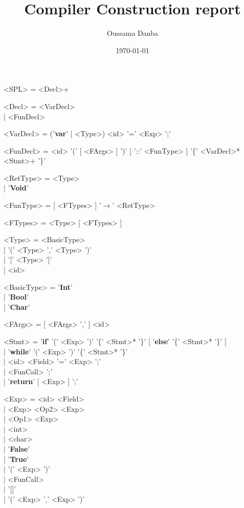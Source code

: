 \documentclass{article}
\title{Compiler Construction report}
\author{Oussama Danba}
\date{\today}
\begin{document}
\maketitle

\renewcommand{\syntleft}{$\langle$\normalfont\ttfamily}
\setlength{\grammarindent}{2cm}
\setlength{\grammarparsep}{0cm}
\begin{grammar}
<SPL> = <Decl>+

<Decl> = <VarDecl> \\| <FunDecl>

<VarDecl> = ('\textbf{var}' | <Type>) <id> '=' <Exp> ';'

<FunDecl> = <id> '(' [ <FArgs> ] ')' [ '::' <FunType> ] '\{' <VarDecl>* <Stmt>+ '\}'

<RetType> = <Type> \\| '\textbf{Void}'

<FunType> = [ <FTypes> ] '$\rightarrow$' <RetType>

<FTypes> = <Type> [ <FTypes> ]

<Type> = <BasicType> \\| '(' <Type> ',' <Type> ')' \\| '[' <Type> ']' \\| <id>

<BasicType> = '\textbf{Int}' \\| '\textbf{Bool}' \\| '\textbf{Char}'

<FArgs> = [ <FArgs> ',' ] <id>

<Stmt> = '\textbf{if}' '(' <Exp> ')' '\{' <Stmt>* '\}' [ '\textbf{else}' '\{' <Stmt>* '\}' ] \\| '\textbf{while}' '(' <Exp> ')' '\{' <Stmt>* '\}' \\| <id> <Field> '=' <Exp> ';' \\| <FunCall> ';' \\| '\textbf{return}' [ <Exp> ] ';'

<Exp> = <id> <Field> \\| <Exp> <Op2> <Exp> \\| <Op1> <Exp> \\| <int> \\| <char> \\| '\textbf{False}' \\| '\textbf{True}' \\| '(' <Exp> ')' \\| <FunCall> \\| '[]' \\| '(' <Exp> ',' <Exp> ')'


\end{grammar}
\end{document}
